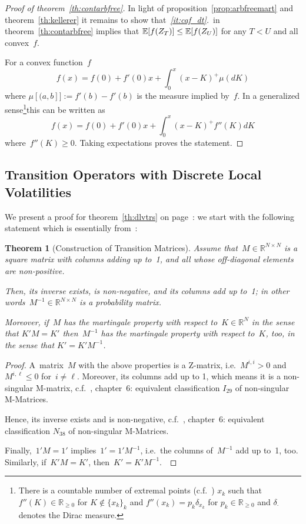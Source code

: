 \documentclass[twoside]{article}
\DeclareRobustCommand{\R}{\mathbb{R}}
\theoremstyle{plain}
\newtheorem{theorem}{Theorem}[section]        %
\theoremstyle{definition}
\theoremstyle{remark}
\begin{document}
\begin{proof}[Proof of theorem~\ref{th:contarbfree}]
    In light of proposition~\ref{prop:arbfreemart} and
    theorem~\ref{th:kellerer} it remains to show that~\textit{\ref{it:caf_dt}.}~in theorem~\ref{th:contarbfree}
    implies that $\mathbb{E}[ f(Z_T) ] \leq \mathbb{E}[ f(Z_U) ]$ for any $T<U$ and all
    convex~$f$.

    For a convex function~$f$
    $$
        f(x) = f(0) + f'(0) x + \int_0^x (x-K)^+ \mu(dK)
    $$
    where $\mu[(a,b]] := f'(b)-f'(b)$ is the measure implied by~$f$. In a
    generalized sense\footnote{
        There is a countable number of extremal points (c.f.~\cite{buehler2006expensive}) $x_k$ such that
        $f''(K)\in\R_{\geq 0}$ for $K\not\in\{x_k\}_k$ and $f''(x_k)=p_k \delta_{x_k}$
        for $p_k\in\R_{\geq 0}$ and $\delta_{\cdot}$ denotes the Dirac measure.
    }this can be written as
    $$
        f(x) = f(0) + f'(0) x + \int_0^x (x-K)^+ f''(K) dK
    $$
    where~$ f''(K)\geq 0$.
    Taking expectations proves the statement.
\end{proof}

\subsection{Transition Operators with Discrete Local Volatilities}\label{sec:appendix_DLV} 

We present a proof for theorem~\ref{th:dlvtrs} on page~\pageref{th:dlvtrs}:
we start with the following statement which is essentially from~\cite{AndreasenHuge}:
\begin{theorem}[Construction of Transition Matrices]\label{th:zmatrix}
    Assume that~$M\in\R^{N\times N}$ is a square matrix with columns adding up to~1, and 
    all whose off-diagonal elements are non-positive.
    
    Then, its inverse exists, is non-negative, and its columns add up to~1; in other
    words~$M^{-1}\in\R^{N\times N}$ is a probability matrix.
    
    Moreover, if~$M$ has the martingale property with respect to~$K\in\R^N$
    in the sense that $K'M=K'$ then~$M^{-1}$ has the martingale property with respect to~$K$,
    too, in the sense that $K'=K'M^{-1}$.
\end{theorem}
\begin{proof}
A~matrix~$M$ with the above properties is a
Z-matrix, i.e.~$M^{i,i}>0$ and~$M^{i,\ell}\leq 0$ for~$i\not=\ell$. Moreover, 
its columns add up to 1, which means
it is a non-singular M-matrix, c.f.~\cite{alma995837143606533}, chapter~6:
equivalent classification $I_{29}$ of non-singular M-Matrices.

Hence, its inverse exists and is non-negative, c.f.~\cite{alma995837143606533}, chapter~6:
equivalent classification $N_{38}$ of non-singular M-Matrices.

Finally,~$1' M = 1'$ implies~$1'  = 1' M^{-1}$, i.e.~the columns of~$M^{-1}$
add up to~1, too. Similarly, if~$K' M = K'$, then~$K' = K' M^{-1}$.\
\end{proof}
\end{document}
